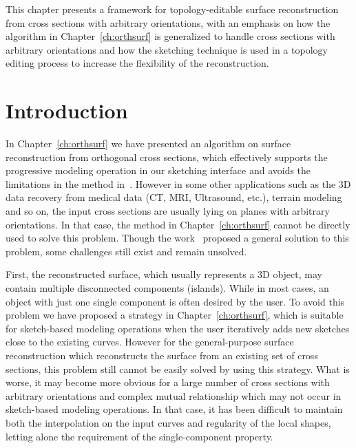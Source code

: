 This chapter presents a framework for topology-editable surface
reconstruction from cross sections with arbitrary orientations, with
an emphasis on how the algorithm in Chapter~\ref{ch:orthsurf} is
generalized to handle cross sections with arbitrary orientations and
how the sketching technique is used in a topology editing process to
increase the flexibility of the reconstruction.

\section{Introduction}
\label{ch6:sec:intro}

In Chapter~\ref{ch:orthsurf} we have presented an algorithm on
surface  reconstruction from orthogonal cross sections, which
effectively supports the progressive modeling operation in our
sketching interface and avoids the limitations in the method
in~\cite{LBDLJ08}. However in some other applications such as the 3D
data recovery from medical data (CT, MRI, Ultrasound, etc.), terrain
modeling and so on, the input cross sections are usually lying on
planes with arbitrary orientations. In that case, the method in
Chapter~\ref{ch:orthsurf} cannot be directly used to solve this
problem. Though the work~\cite{LBDLJ08} proposed a general solution
to this problem, some challenges still exist and remain unsolved.

First, the reconstructed surface, which usually represents a 3D
object, may contain multiple disconnected components (islands).
While in most cases, an object with just one single component is
often desired by the user. To avoid this problem we have proposed a strategy in Chapter~\ref{ch:orthsurf}, which is suitable for sketch-based modeling operations when the user iteratively adds new sketches close to the existing curves. However for the general-purpose surface reconstruction which reconstructs the surface from an existing set of cross sections, this problem still cannot be easily solved by using this strategy. What is worse, it may become more obvious for a large number of cross sections with arbitrary orientations and complex mutual relationship which may not occur in sketch-based modeling operations. In that case, it has been difficult to maintain both the interpolation on the input curves and regularity of the local shapes, letting alone the requirement of the single-component property.

